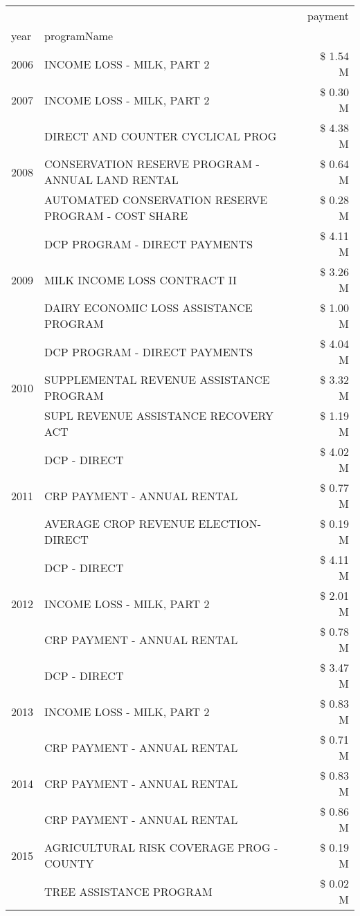 \begin{tabular}{llr}
\toprule
 &  & payment \\
year & programName &  \\
\midrule
2006 & INCOME LOSS - MILK, PART 2 & \$ 1.54 M \\
\cline{1-3}
2007 & INCOME LOSS - MILK, PART 2 & \$ 0.30 M \\
\cline{1-3}
\multirow[t]{3}{*}{2008} & DIRECT AND COUNTER CYCLICAL PROG & \$ 4.38 M \\
 & CONSERVATION RESERVE PROGRAM - ANNUAL LAND RENTAL & \$ 0.64 M \\
 & AUTOMATED CONSERVATION RESERVE PROGRAM - COST SHARE & \$ 0.28 M \\
\cline{1-3}
\multirow[t]{3}{*}{2009} & DCP PROGRAM - DIRECT PAYMENTS & \$ 4.11 M \\
 & MILK INCOME LOSS CONTRACT II & \$ 3.26 M \\
 & DAIRY ECONOMIC LOSS ASSISTANCE PROGRAM & \$ 1.00 M \\
\cline{1-3}
\multirow[t]{3}{*}{2010} & DCP PROGRAM - DIRECT PAYMENTS & \$ 4.04 M \\
 & SUPPLEMENTAL REVENUE ASSISTANCE PROGRAM & \$ 3.32 M \\
 & SUPL REVENUE ASSISTANCE RECOVERY ACT & \$ 1.19 M \\
\cline{1-3}
\multirow[t]{3}{*}{2011} & DCP - DIRECT & \$ 4.02 M \\
 & CRP PAYMENT - ANNUAL RENTAL & \$ 0.77 M \\
 & AVERAGE CROP REVENUE ELECTION-DIRECT & \$ 0.19 M \\
\cline{1-3}
\multirow[t]{3}{*}{2012} & DCP - DIRECT & \$ 4.11 M \\
 & INCOME LOSS - MILK, PART 2 & \$ 2.01 M \\
 & CRP PAYMENT - ANNUAL RENTAL & \$ 0.78 M \\
\cline{1-3}
\multirow[t]{3}{*}{2013} & DCP - DIRECT & \$ 3.47 M \\
 & INCOME LOSS - MILK, PART 2 & \$ 0.83 M \\
 & CRP PAYMENT - ANNUAL RENTAL & \$ 0.71 M \\
\cline{1-3}
2014 & CRP PAYMENT - ANNUAL RENTAL & \$ 0.83 M \\
\cline{1-3}
\multirow[t]{3}{*}{2015} & CRP PAYMENT - ANNUAL RENTAL & \$ 0.86 M \\
 & AGRICULTURAL RISK COVERAGE PROG - COUNTY & \$ 0.19 M \\
 & TREE ASSISTANCE PROGRAM & \$ 0.02 M \\

\end{tabular}
